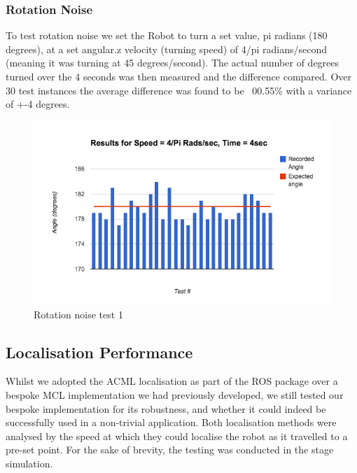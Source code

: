 \documentclass{article}
\begin{document}
\begin{multicols}{2}
	\subsubsection{Rotation Noise}
	To test rotation noise we set the Robot to turn a set value, pi radians (180 degrees), at a set angular.z velocity (turning speed) of 4/pi radians/second (meaning it was turning at 45 degrees/second). The actual number of degrees turned over the 4 seconds was then measured and the difference compared. Over 30 test instances the average difference was found to be ~00.55\% with a variance of +-4 degrees.
	\begin{figure}[H]
	\centering
	\includegraphics[width=\linewidth]{ExperimentalResults7}
	\caption{Rotation noise test 1}
	\end{figure}
	
	\subsection{Localisation Performance}
	Whilst we adopted the ACML localisation as part of the ROS package over a bespoke MCL implementation we had previously developed, we still tested our bespoke implementation for its robustness, and whether it could indeed be successfully used in a non-trivial application. Both localisation methods were analysed by the speed at which they could localise the robot as it travelled to a pre-set point. For the sake of brevity, the testing was conducted in the stage simulation.


\end{multicols}
\end{document}
